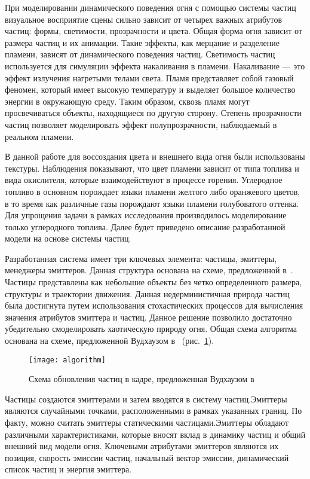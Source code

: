 При моделировании динамического поведения огня с помощью системы частиц
визуальное восприятие сцены сильно зависит от четырех важных атрибутов частиц:
формы, светимости, прозрачности и цвета. Общая форма огня зависит от размера
частиц и их анимации. Такие эффекты, как мерцание и разделение пламени, зависят
от динамического поведения частиц. Светимость частиц используется для симуляции
эффекта накаливания в пламени. Накаливание --- это эффект излучения нагретыми телами
света. Пламя представляет собой газовый феномен, который имеет высокую
температуру и выделяет большое количество энергии в окружающую среду. Таким
образом, сквозь пламя могут просвечиваться объекты, находящиеся по другую
сторону. Степень прозрачности частиц позволяет моделировать эффект
полупрозрачности, наблюдаемый в реальном пламени.

В данной работе для воссоздания цвета и внешнего вида огня были использованы
текстуры. Наблюдения показывают, что цвет пламени зависит от типа топлива и вида
окислителя, которые взаимодействуют в процессе горения. Углеродное топливо в
основном порождает языки пламени желтого либо оранжевого цветов, в то время как
различные газы порождают языки пламени голубоватого оттенка. Для упрощения
задачи в рамках исследования производилось моделирование только углеродного
топлива. Далее будет приведено описание разработанной модели на основе системы
частиц.

Разработанная система имеет три ключевых элемента: частицы, эмиттеры, менеджеры
эмиттеров. Данная структура основана на схеме, предложенной
в~\cite{Somasekaran2005UsingPS}. Частицы представлены как небольшие объекты без
четко определенного размера, структуры и траектории движения. Данная
недерминистичная природа частиц была достигнута путем использования
стохастических процессов для вычисления значения атрибутов эмиттера и частиц.
Данное решение позволило достаточно убедительно смоделировать хаотическую
природу огня. Общая схема алгоритма основана на схеме, предложенной Вудхаузом
в~\cite{Woodhouse} (рис.~\ref{fig:algorithm}).

\begin{figure}[htb]
	\centering
	\texttt{[image: algorithm]}
    \caption{Схема обновления частиц в кадре, предложенная Вудхаузом
    в~\cite{Woodhouse}}%
    \label{fig:algorithm}
\end{figure}

Частицы создаются эмиттерами и затем вводятся в систему частиц.\break{}Эмиттеры
являются случайными точками, расположенными в рамках указанных границ. По факту,
можно считать эмиттеры статическими частицами.\break{}Эмиттеры обладают
различными характеристиками, которые вносят вклад в динамику частиц и общий
внешний вид модели огня. Ключевыми атрибутами эмиттеров являются их позиция,
скорость эмиссии частиц, начальный вектор эмиссии, динамический список частиц и
энергия эмиттера.


